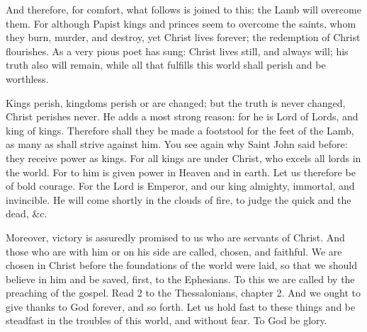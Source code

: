 And therefore, for comfort, what follows is joined to this: the Lamb will overcome them. For although Papist kings and princes seem to overcome the saints, whom they burn, murder, and destroy, yet Christ lives forever; the redemption of Christ flourishes. As a very pious poet has sung: Christ lives still, and always will; his truth also will remain, while all that fulfills this world shall perish and be worthless.

Kings perish, kingdoms perish or are changed; but the truth is never changed, Christ perishes never. He adds a most strong reason: for he is Lord of Lords, and king of kings. Therefore shall they be made a footstool for the feet of the Lamb, as many as shall strive against him. You see again why Saint John said before: they receive power as kings. For all kings are under Christ, who excels all lords in the world. For to him is given power in Heaven and in earth. Let us therefore be of bold courage. For the Lord is Emperor, and our king almighty, immortal, and invincible. He will come shortly in the clouds of fire, to judge the quick and the dead, \&c.

Moreover, victory is assuredly promised to us who are servants of Christ. And those who are with him or on his side are called, chosen, and faithful. We are chosen in Christ before the foundations of the world were laid, so that we should believe in him and be saved, first, to the Ephesians. To this we are called by the preaching of the gospel. Read 2 to the Thessalonians, chapter 2. And we ought to give thanks to God forever, and so forth. Let us hold fast to these things and be steadfast in the troubles of this world, and without fear. To God be glory.
